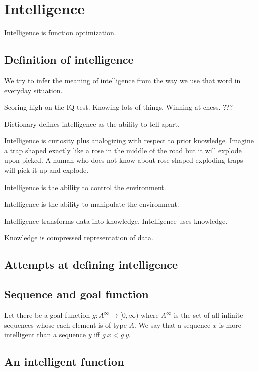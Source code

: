 \chapter{Intelligence}

Intelligence is function optimization.

\section{Definition of intelligence}

We try to infer the meaning of intelligence
from the way we use that word in everyday situation.

Scoring high on the IQ test.
Knowing lots of things.
Winning at chess.
???

Dictionary defines intelligence as the ability to tell apart.

Intelligence is curiosity plus analogizing with respect to prior knowledge.
Imagine a trap shaped exactly like a rose in the middle of the road but it will explode upon picked.
A human who does not know about rose-shaped exploding traps will pick it up and explode.

Intelligence is the ability to control the environment.

Intelligence is the ability to manipulate the environment.

Intelligence transforms data into knowledge.
Intelligence uses knowledge.

Knowledge is compressed representation of data.

\section{Attempts at defining intelligence}

\section{Sequence and goal function}

Let there be a goal function \(g : A^\infty \to [0,\infty)\)
where \(A^\infty\) is the set of all infinite sequences whose each element is of type \(A\).
We say that a sequence \(x\) is more intelligent than a sequence \(y\) iff \(g~x < g~y\).

\section{An intelligent function}

